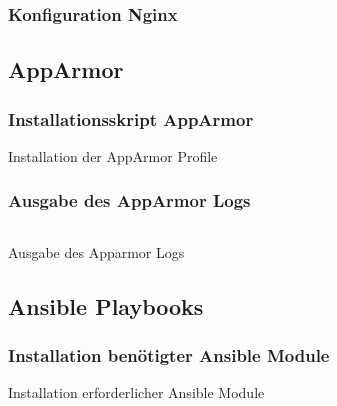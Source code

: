 \subsubsection{Konfiguration Nginx}

\subsection{AppArmor}
\subsubsection{Installationsskript AppArmor}


\begin{longlisting}[ht]{}
    \caption{Installation der AppArmor Profile}
    \label{listing:installation_apparmor}
\end{longlisting}

\subsubsection{Ausgabe des AppArmor Logs}

\begin{longlisting}
    \inputminted[fontfamily=tt,
    linenos=true,
    numberblanklines=true,
    numbersep=5pt,
    gobble=0,
    frame=leftline,
    framerule=0.4pt,
    framesep=2mm,
    funcnamehighlighting=true,
    tabsize=4,
    obeytabs=false,
    mathescape=false
    samepage=false, %
    showspaces=false,
    showtabs =false,
    texcl=false,
    breaklines=true,
    lastline=10]{text}{code/shell/apparmor.log}
    \caption{Ausgabe des Apparmor Logs}
    \label{listing:log_apparmor}
\end{longlisting}
\newpage
\subsection{Ansible Playbooks}

\subsubsection{Installation benötigter Ansible Module}
\begin{listing}[ht]
    \caption{Installation erforderlicher Ansible Module}
    \label{listing:ansible_module_installation}
\end{listing}


